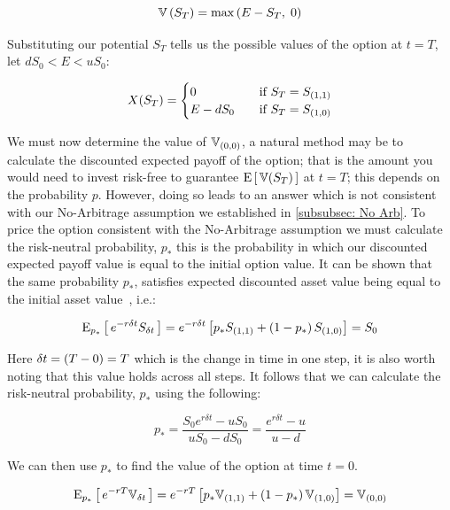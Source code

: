 \begin{equation*}
    \mathbb{V}\left(S_T\right) = \max\left(E-S_T,\;0\right)
\end{equation*}

Substituting our potential \(S_T\) tells us the possible values of the option at \(t=T\), let \(dS_0 < E < uS_0\):

\begin{align*}
    X(S_T) 
    =
    \begin{cases}
        0 &\quad \text{if }S_T=S_{\left(1,1\right)} \\
        E-dS_0 &\quad \text{if }S_T=S_{\left(1,0\right)}
    \end{cases}
\end{align*}

We must now determine the value of \(\mathbb{V}_{\left(0,0\right)}\), a natural method may be to calculate the discounted expected payoff of the option; that is the amount you would need to invest risk-free to guarantee \(\text{E}\left[\,\mathbb{V}(S_T)\,\right]\) at \(t=T\); this depends on the probability \(p\). However, doing so leads to an answer which is not consistent with our No-Arbitrage assumption we established in \autoref{subsubsec: No Arb}. To price the option consistent with the No-Arbitrage assumption we must calculate the risk-neutral probability, \(p_*\) this is the probability in which our discounted expected payoff value is equal to the initial option value. It can be shown that the same probability \(p_*\), satisfies expected discounted asset value being equal to the initial asset value~\cite{higham2004introduction}, i.e.:

\begin{equation*}
    \text{E}_{p_*}\left[\,e^{-r\delta t}S_{\delta t}\,\right] = e^{-r\delta t}\left[p_*S_{\left(1,1\right)} + \left(1-p_*\right)S_{\left(1,0\right)}\right] = S_0
\end{equation*}

Here \(\delta t = \left(T-0\right) = T\) which is the change in time in one step, it is also worth noting that this value holds across all steps. It follows that we can calculate the risk-neutral probability, \(p_*\) using the following:

\begin{equation}\label{eqn: Risk Neutral Prob}
    p_* = \frac{S_0e^{r\delta t} - uS_0}{uS_0 - dS_0} = \frac{e^{r\delta t} - u}{u - d}
\end{equation}

We can then use \(p_*\) to find the value of the option at time \(t = 0\).

\begin{equation*}
     \text{E}_{p_*}\left[\,e^{-rT}\mathbb{V}_{\delta t}\,\right] = e^{-rT}\left[p_*\mathbb{V}_{\left(1,1\right)} + \left(1-p_*\right)\mathbb{V}_{\left(1,0\right)}\right] = \mathbb{V}_{\left(0,0\right)}
\end{equation*}

